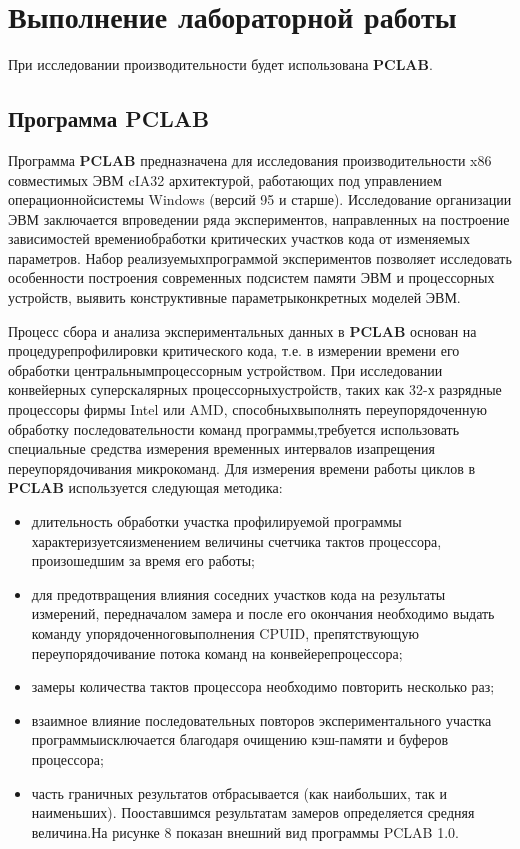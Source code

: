 \chapter{Выполнение лабораторной работы}
При исследовании производительности будет использована \textbf{PCLAB}. 

\section{Программа  PCLAB}

Программа \textbf{PCLAB} предназначена  для исследования  производительности x86 совместимых ЭВМ  cIA32 архитектурой, работающих под управлением операционнойсистемы Windows (версий 95 и старше). Исследование организации ЭВМ заключается впроведении  ряда экспериментов, направленных на построение зависимостей  времениобработки критических участков кода от изменяемых параметров. Набор реализуемыхпрограммой экспериментов позволяет исследовать особенности построения современных подсистем памяти ЭВМ и процессорных устройств, выявить конструктивные параметрыконкретных моделей ЭВМ.

Процесс сбора и анализа экспериментальных данных в \textbf{PCLAB} основан на процедурепрофилировки критического кода, т.е. в измерении времени его обработки центральнымпроцессорным устройством. При исследовании конвейерных суперскалярных процессорныхустройств, таких как 32-х разрядные процессоры фирмы  Intel  или  AMD, способныхвыполнять   переупорядоченную   обработку   последовательности   команд   программы,требуется   использовать   специальные   средства   измерения   временных   интервалов   изапрещения переупорядочивания микрокоманд.  Для измерения времени работы циклов в \textbf{PCLAB} используется следующая методика:
\begin{itemize}
	\item длительность   обработки   участка   профилируемой   программы   характеризуетсяизменением величины счетчика тактов процессора, произошедшим за время его работы; 
	\item для предотвращения влияния соседних участков кода на результаты измерений, передначалом замера и после его окончания необходимо выдать команду упорядоченноговыполнения CPUID, препятствующую переупорядочивание потока команд на конвейерепроцессора;
	\item замеры количества тактов процессора необходимо повторить несколько раз;
	\item взаимное влияние последовательных повторов экспериментального участка программыисключается благодаря очищению кэш-памяти и буферов процессора;
	\item часть граничных результатов отбрасывается (как наибольших, так и наименьших). Пооставшимся результатам замеров определяется средняя величина.На рисунке 8 показан внешний вид программы PCLAB 1.0.
\end{itemize}


